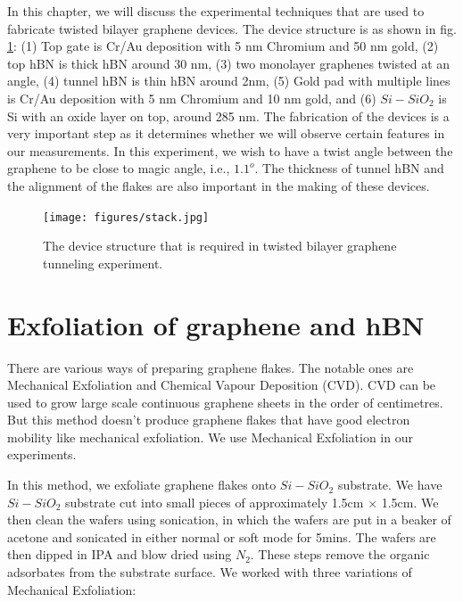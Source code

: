 \label{section:c}
In this chapter, we will discuss the experimental techniques that are used to fabricate twisted bilayer graphene devices. The device structure is as shown in fig. \ref{fig:stack}: (1) Top gate is Cr/Au deposition with 5 nm Chromium and 50 nm gold, (2) top hBN is thick hBN around 30 nm, (3) two monolayer graphenes twisted at an angle, (4) tunnel hBN is thin hBN around 2nm, (5) Gold pad with multiple lines is Cr/Au deposition with 5 nm Chromium and 10 nm gold, and (6) $Si-SiO_2$ is Si with an oxide layer on top, around 285 nm. The fabrication of the devices is a very important step as it determines whether we will observe certain features in our measurements. In this experiment, we wish to have a twist angle between the graphene to be close to magic angle, i.e., $1.1 ^o$. The thickness of tunnel hBN and the alignment of the flakes are also important in the making of these devices.

\begin{figure}[H]
	\centering
	\texttt{[image: figures/stack.jpg]}
	\caption{The device structure that is required in twisted bilayer graphene tunneling experiment.}
	\label{fig:stack}
\end{figure}

\section{Exfoliation of graphene and hBN}

There are various ways of preparing graphene flakes. \cite{Bhuyan2016, Yi2015} The notable ones are Mechanical Exfoliation and Chemical Vapour Deposition (CVD). CVD can be used to grow large scale continuous graphene sheets in the order of centimetres. But this method doesn't produce graphene flakes that have good electron mobility like mechanical exfoliation. We use Mechanical Exfoliation in our experiments.

In this method, we exfoliate graphene flakes onto $Si-SiO_2$ substrate. We have $Si-SiO_2$ substrate cut into small pieces of approximately 1.5cm $\times$ 1.5cm. We then clean the wafers using sonication, in which the wafers are put in a beaker of acetone and sonicated in either normal or soft mode for 5mins. The wafers are then dipped in IPA and blow dried using $N_2$. These steps remove the organic adsorbates from the substrate surface. We worked with three variations of Mechanical Exfoliation:

